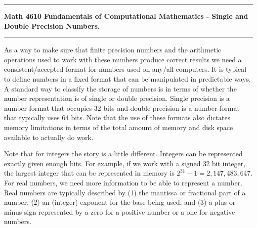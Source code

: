 \documentclass[10pt,fleqn]{article}
\begin{document}
\vskip0.1in\hrule\vskip0.1in
\noindent
{\bf Math 4610 Fundamentals of Computational Mathematics  -  Single and Double
 Precision Numbers.}
\vskip0.1in\hrule\vskip0.1in
\noindent
As a way to make sure that finite precision numbers and the arithmetic
operations used to work with these numbers produce correct results we need a
consistent/accepted format for numbers used on any/all computers. It is typical
to define numbers in a fixed format that can be manipulated in predictable ways.
A standard way to classify the storage of numbers is in terms of whether the
number representation is of single or double precision. Single precision is a
number format that occupies 32 bits and double precision is a number format that
typically uses 64 bits. Note that the use of these formats also dictates memory
limitations in terms of the total amount of memory and disk space available to
actually do work.

Note that for integers the story is a little different. Integers can be
represented exactly given enough bits. For example, if we work with a
signed 32 bit integer, the largest integer that can be represented in memory is
$2^{31}-1=2,147,483,647$. For real numbers, we need more information to be able
to represent a number. Real numbers are typically described by (1) the mantissa
or fractional part of a number, (2) an (integer) exponent for the base being
used, and (3) a plus or minus sign represented by a zero for a positive number
or a one for negative numbers.
\end{document}
